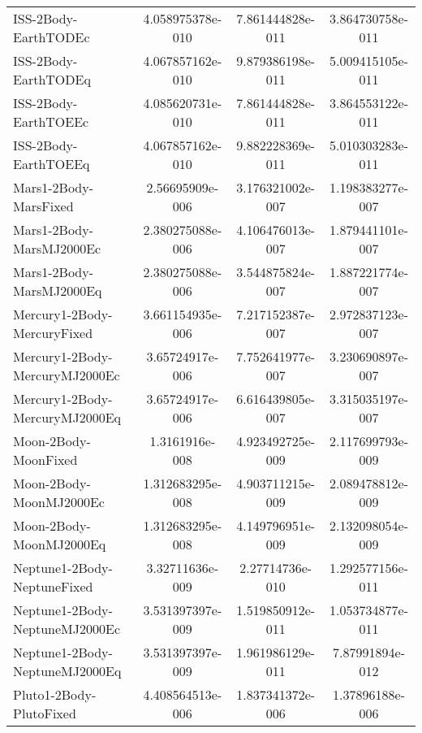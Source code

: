 \begin{table}[htbp!]
\begin{tabular}{lccc}
         ISS-2Body-EarthTODEc & 4.058975378e-010 & 7.861444828e-011 & 3.864730758e-011 \\
         ISS-2Body-EarthTODEq & 4.067857162e-010 & 9.879386198e-011 & 5.009415105e-011 \\
         ISS-2Body-EarthTOEEc & 4.085620731e-010 & 7.861444828e-011 & 3.864553122e-011 \\
         ISS-2Body-EarthTOEEq & 4.067857162e-010 & 9.882228369e-011 & 5.010303283e-011 \\
         Mars1-2Body-MarsFixed & 2.56695909e-006 & 3.176321002e-007 & 1.198383277e-007 \\
         Mars1-2Body-MarsMJ2000Ec & 2.380275088e-006 & 4.106476013e-007 & 1.879441101e-007 \\
         Mars1-2Body-MarsMJ2000Eq & 2.380275088e-006 & 3.544875824e-007 & 1.887221774e-007 \\
         Mercury1-2Body-MercuryFixed & 3.661154935e-006 & 7.217152387e-007 & 2.972837123e-007 \\
         Mercury1-2Body-MercuryMJ2000Ec & 3.65724917e-006 & 7.752641977e-007 & 3.230690897e-007 \\
         Mercury1-2Body-MercuryMJ2000Eq & 3.65724917e-006 & 6.616439805e-007 & 3.315035197e-007 \\
         Moon-2Body-MoonFixed & 1.3161916e-008 & 4.923492725e-009 & 2.117699793e-009 \\
         Moon-2Body-MoonMJ2000Ec & 1.312683295e-008 & 4.903711215e-009 & 2.089478812e-009 \\
         Moon-2Body-MoonMJ2000Eq & 1.312683295e-008 & 4.149796951e-009 & 2.132098054e-009 \\
         Neptune1-2Body-NeptuneFixed & 3.32711636e-009 & 2.27714736e-010 & 1.292577156e-011 \\
         Neptune1-2Body-NeptuneMJ2000Ec & 3.531397397e-009 & 1.519850912e-011 & 1.053734877e-011 \\
         Neptune1-2Body-NeptuneMJ2000Eq & 3.531397397e-009 & 1.961986129e-011 & 7.87991894e-012 \\
         Pluto1-2Body-PlutoFixed & 4.408564513e-006 & 1.837341372e-006 & 1.37896188e-006 \\

\end{tabular}
\end{table}
